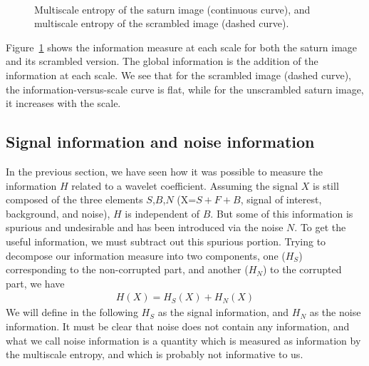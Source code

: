\begin{figure}[htb]
\centerline{
\hbox{
}}
\caption{Multiscale entropy of the saturn image (continuous curve), 
and multiscale
entropy of the scrambled image (dashed curve).}
\label{fig_multi_memscale}
\end{figure}
Figure~\ref{fig_multi_memscale} shows the information measure at each
scale for both the saturn image and its scrambled version. The global 
information is the addition of the information at each scale. We see
that for the scrambled image (dashed curve), the 
information-versus-scale 
curve is flat, while for the unscrambled saturn image,
it increases with the scale.  

\subsection{Signal information and noise information}

In the previous section, we have seen how it was possible to measure
the information $H$ related to a wavelet coefficient. 
Assuming the signal $X$ is still composed of the three elements $S$,$B$,$N$ 
(X=$S+F+B$, signal of interest, background, and noise),
$H$ is independent of $B$. But some of this information 
is spurious and undesirable and has been introduced via the noise $N$. 
To get the useful information, we must subtract out this spurious portion.
Trying to decompose our information measure
into two components, one ($H_S$) corresponding to the non-corrupted part, and
another  ($H_N$) to the corrupted part, we have
\begin{eqnarray}
H(X) = H_S(X) + H_N(X)
\end{eqnarray}
We will define in the following $H_S$ as the signal information, and $H_N$
as the noise information. It must be clear that noise does not 
contain any information, and what we call noise information is a quantity
which is measured as information by the multiscale entropy, and which is 
probably not informative to us.

